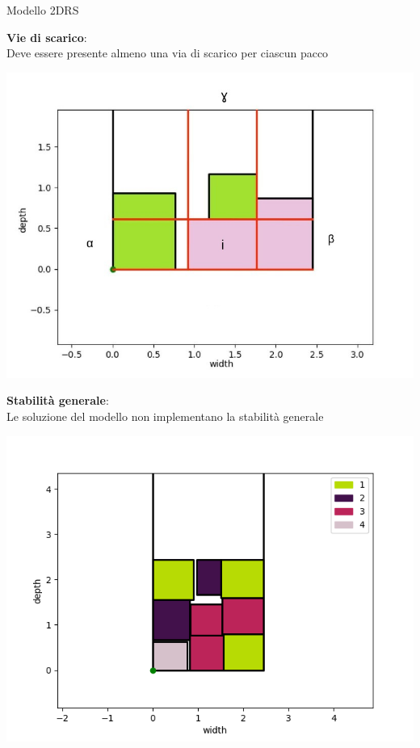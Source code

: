\documentclass{beamer}
\begin{document}
\begin{frame}{Modello 2DRS}
							
	\begin{minipage}[c]{0.45\textwidth}
		\textbf{Vie di scarico}:\\Deve essere presente almeno una via di scarico per ciascun pacco
	\end{minipage}
	\hfill
	\begin{minipage}[c]{0.45\textwidth}
		\includegraphics[width=1\linewidth]{figures/abg_2drs}
	\end{minipage}
																								
	\begin{minipage}[c]{0.45\textwidth}
		\textbf{Stabilit\`a generale}:\\Le soluzione del modello non implementano la stabilit\`a generale
	\end{minipage}
	\hfill
	\begin{minipage}[c]{0.45\textwidth}
		\includegraphics[width=1\linewidth]{figures/2d3d}
	\end{minipage}
\end{frame}
\end{document}
